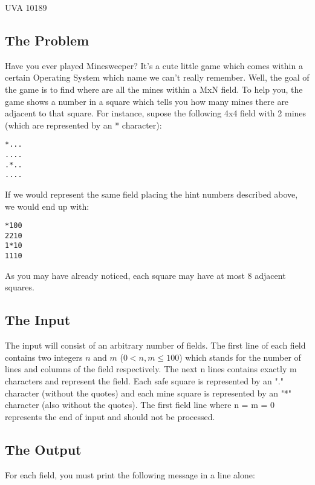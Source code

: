  

\noindent
UVA 10189\bigskip

\subsection*{The Problem}

Have you ever played Minesweeper? It's a cute little game which comes within a certain 
Operating System which name we can't really remember. Well, the goal of the game is to
find where are all the mines within a MxN field. To help you, the game shows a number
in a square which tells you how many mines there are adjacent to that square. For instance,
supose the following 4x4 field with 2 mines (which are represented by an * character):

\begin{verbatim}
*...
....
.*..
....
\end{verbatim}

If we would represent the same field placing the hint numbers described above, we would end up with:

\begin{verbatim}
*100
2210
1*10
1110
\end{verbatim}

As you may have already noticed, each square may have at most 8 adjacent squares.

\subsection*{The Input}

The input will consist of an arbitrary number of fields. The first line of each field contains
two integers $n$ and $m$ ($0 < n,m \leqslant 100$) which stands for the number of lines and columns of the field
respectively. The next n lines contains exactly m characters and represent the field. Each safe
square is represented by an "." character (without the quotes) and each mine square is represented
by an "*" character (also without the quotes). The first field line where n = m = 0 represents the end 
of input and should not be processed.

\subsection*{The Output}

For each field, you must print the following message in a line alone:

